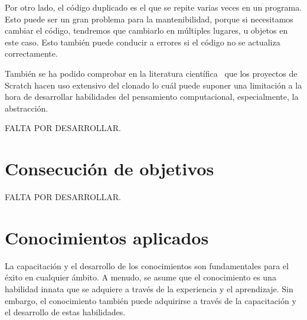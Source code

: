 \documentclass[a4paper, 12pt]{book}
\begin{document}
Por otro lado, el código duplicado es el que se repite varias veces en un programa. Esto puede ser un gran problema para la mantenibilidad, porque si necesitamos cambiar el código, tendremos que cambiarlo en múltiples lugares, u objetos en este caso. Esto también puede conducir a errores si el código no se actualiza correctamente.

También se ha podido comprobar en la literatura científica~\cite{baxter_yahin} que los proyectos de Scratch hacen uso extensivo del clonado lo cuál puede suponer una limitación a la hora de desarrollar habilidades del pensamiento computacional, especialmente, la abstracción.

FALTA POR DESARROLLAR.

\section{Consecución de objetivos}
\label{sec:consecucion-objetivos}





FALTA POR DESARROLLAR.

\section{Conocimientos aplicados}
\label{sec:aplicacion}


La capacitación y el desarrollo de los conocimientos son fundamentales para el éxito en cualquier ámbito. A menudo, se asume que el conocimiento es una habilidad innata que se adquiere a través de la experiencia y el aprendizaje. Sin embargo, el conocimiento también puede adquirirse a través de la capacitación y el desarrollo de estas habilidades.
\end{document}
